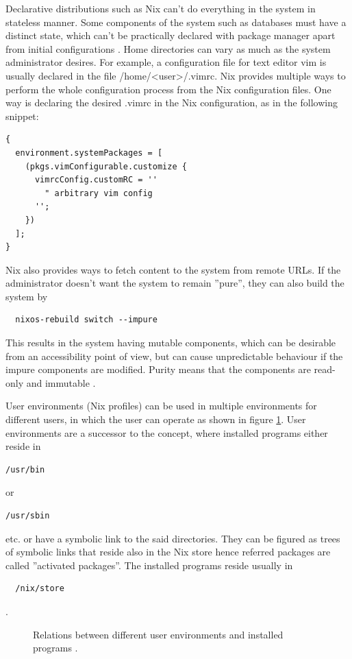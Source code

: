 Declarative distributions such as Nix can't do everything in the
system in stateless manner. Some components of the system such as
databases must have a distinct state, which can't be practically
declared with package manager apart from initial configurations
\cite{van2013reference}. Home directories can vary as much as the
system administrator desires. For example, a configuration file for
text editor vim is usually declared in the file
/home/<user>/.vimrc. Nix provides multiple ways to perform the whole
configuration process from the Nix configuration files. One way is
declaring the desired .vimrc in the Nix configuration, as in the
following snippet:

\begin{lstlisting}
{
  environment.systemPackages = [
    (pkgs.vimConfigurable.customize {
      vimrcConfig.customRC = ''
        " arbitrary vim config
      '';
    })
  ];
}
\end{lstlisting}
Nix also provides ways to fetch content to the system from
remote URLs. If the administrator doesn't want the system to
remain ''pure'', they can also build the system by
\begin{lstlisting}
  nixos-rebuild switch --impure
\end{lstlisting}
This results in the system having mutable components, which can be
desirable from an accessibility point of view, but can cause
unpredictable behaviour if the impure components are modified. Purity means that the components are read-only and
immutable \cite{dolstra2010nixos}.

User environments (Nix profiles) can be used in multiple environments for different users, in which the user can operate as shown in figure  \ref{userenvs}. User
environments are a successor to the concept, where installed programs
either reside in
\begin{lstlisting}
/usr/bin
\end{lstlisting}
or
\begin{lstlisting}
/usr/sbin
\end{lstlisting}
etc. or have a symbolic link to
the said directories. They can be figured as trees of symbolic links
that reside also in the Nix store hence referred packages are called
''activated packages''. The installed programs reside usually in
\begin{lstlisting}
  /nix/store
\end{lstlisting} \cite{dolstra2008nixos}.

\begin{figure}[t!]
\centerline{}
\caption{Relations between different user environments and installed
  programs \cite{nixosUserEnvironment}.}
\label{userenvs}
\end{figure}

